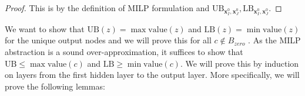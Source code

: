 \documentclass[]{article}
\newtheorem{lemma}{Lemma}
\theoremstyle{definition}
\newcommand{\ReLU}{\mathrm{ReLU}}
\newcommand{\Val}{\mathrm{value}}
\newcommand{\UB}{\mathrm{UB}}
\newcommand{\LB}{\mathrm{LB}}
\newcommand{\B}{\mathrm{B}}
\begin{document}
			\begin{proof}
				This is by the definition of MILP formulation and $\UB_{\boldsymbol{x}^0_I,\boldsymbol{x}^0_J}, \LB_{\boldsymbol{x}^0_I,\boldsymbol{x}^0_J}$.
			\end{proof}
			
			
			
			We want to show that $\mathrm{UB}(z) = \max \Val (z)$ and $\mathrm{LB}(z) = \min \Val(z)$ for the unique output nodes and we will prove this for all $c\notin B_{zero}$ . As the MILP abstraction is a sound over-approximation, 
			it suffices to show that $\mathrm{UB}\leq \max \Val(c)$ and $\mathrm{LB} \geq \min \Val(c)$. We will prove this by induction on layers from the first hidden layer to the output layer. More specifically, we will prove the following lemmas:
			
\end{document}

